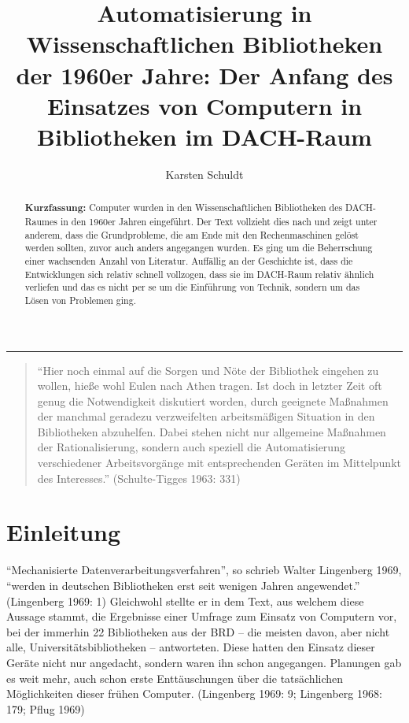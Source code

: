 \documentclass[a4paper,
fontsize=11pt,
oneside,
numbers=noperiodatend,
parskip=half-,
bibliography=totoc,
final
]{scrartcl}
\title{\LARGE{Automatisierung in Wissenschaftlichen Bibliotheken der 1960er Jahre: Der Anfang des Einsatzes von Computern in Bibliotheken im DACH-Raum}}%
\author{Karsten Schuldt} %
\date{}
\begin{document}
\maketitle
\thispagestyle{fancyplain} 

\begin{abstract}
\noindent
\textbf{Kurzfassung:} Computer wurden in den Wissenschaftlichen Bibliotheken des DACH-Raumes
in den 1960er Jahren eingeführt. Der Text vollzieht dies nach und zeigt
unter anderem, dass die Grundprobleme, die am Ende mit den
Rechenmaschinen gelöst werden sollten, zuvor auch anders angegangen
wurden. Es ging um die Beherrschung einer wachsenden Anzahl von
Literatur. Auffällig an der Geschichte ist, dass die Entwicklungen sich
relativ schnell vollzogen, dass sie im DACH-Raum relativ ähnlich
verliefen und das es nicht per se um die Einführung von Technik, sondern
um das Lösen von Problemen ging.
\end{abstract}

\begin{center}\rule{0.5\linewidth}{0.5pt}\end{center}


\begin{quote}
\enquote{Hier noch einmal auf die Sorgen und Nöte der Bibliothek eingehen zu
wollen, hieße wohl Eulen nach Athen tragen. Ist doch in letzter Zeit oft
genug die Notwendigkeit diskutiert worden, durch geeignete Maßnahmen der
manchmal geradezu verzweifelten arbeitsmäßigen Situation in den
Bibliotheken abzuhelfen. Dabei stehen nicht nur allgemeine Maßnahmen der
Rationalisierung, sondern auch speziell die Automatisierung
verschiedener Arbeitsvorgänge mit entsprechenden Geräten im Mittelpunkt
des Interesses.} (Schulte-Tigges 1963: 331)
\end{quote}

\hypertarget{einleitung}{%
\section{Einleitung}\label{einleitung}}

\enquote{Mechanisierte Datenverarbeitungsverfahren}, so schrieb Walter
Lingenberg 1969, \enquote{werden in deutschen Bibliotheken erst seit wenigen
Jahren angewendet.} (Lingenberg 1969: 1) Gleichwohl stellte er in dem
Text, aus welchem diese Aussage stammt, die Ergebnisse einer Umfrage zum
Einsatz von Computern vor, bei der immerhin 22 Bibliotheken aus der BRD
-- die meisten davon, aber nicht alle, Universitätsbibliotheken --
antworteten. Diese hatten den Einsatz dieser Geräte nicht nur angedacht,
sondern waren ihn schon angegangen. Planungen gab es weit mehr, auch
schon erste Enttäuschungen über die tatsächlichen Möglichkeiten dieser
frühen Computer. (Lingenberg 1969: 9; Lingenberg 1968: 179; Pflug 1969)
\end{document}

